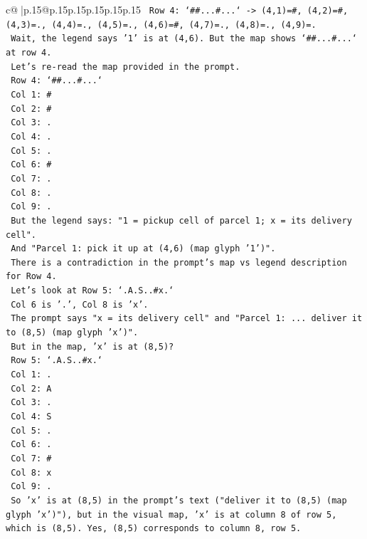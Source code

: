 \documentclass{article}
\begin{document}
{\begin{supertabular}{c@{$\;$}|p{.15\linewidth}@{}p{.15\linewidth}p{.15\linewidth}p{.15\linewidth}p{.15\linewidth}p{.15\linewidth}}
{{{\texttt{   Row 4: `\#\#...\#...` {-}> (4,1)=\#, (4,2)=\#, (4,3)=., (4,4)=., (4,5)=., (4,6)=\#, (4,7)=., (4,8)=., (4,9)=.} \\
\texttt{   Wait, the legend says '1' is at (4,6). But the map shows `\#\#...\#...` at row 4.} \\
\texttt{   Let's re{-}read the map provided in the prompt.} \\
\texttt{   Row 4: `\#\#...\#...`} \\
\texttt{   Col 1: \#} \\
\texttt{   Col 2: \#} \\
\texttt{   Col 3: .} \\
\texttt{   Col 4: .} \\
\texttt{   Col 5: .} \\
\texttt{   Col 6: \#} \\
\texttt{   Col 7: .} \\
\texttt{   Col 8: .} \\
\texttt{   Col 9: .} \\
\texttt{   But the legend says: "1 = pickup cell of parcel 1; x = its delivery cell".} \\
\texttt{   And "Parcel 1: pick it up at (4,6) (map glyph '1')".} \\
\texttt{   There is a contradiction in the prompt's map vs legend description for Row 4.} \\
\texttt{   Let's look at Row 5: `.A.S..\#x.`} \\
\texttt{   Col 6 is '.', Col 8 is 'x'.} \\
\texttt{   The prompt says "x = its delivery cell" and "Parcel 1: ... deliver it to (8,5) (map glyph 'x')".} \\
\texttt{   But in the map, 'x' is at (8,5)?} \\
\texttt{   Row 5: `.A.S..\#x.`} \\
\texttt{   Col 1: .} \\
\texttt{   Col 2: A} \\
\texttt{   Col 3: .} \\
\texttt{   Col 4: S} \\
\texttt{   Col 5: .} \\
\texttt{   Col 6: .} \\
\texttt{   Col 7: \#} \\
\texttt{   Col 8: x} \\
\texttt{   Col 9: .} \\
\texttt{   So 'x' is at (8,5) in the prompt's text ("deliver it to (8,5) (map glyph 'x')"), but in the visual map, 'x' is at column 8 of row 5, which is (8,5). Yes, (8,5) corresponds to column 8, row 5.} \\
}}}
\end{supertabular}}
\end{document}
